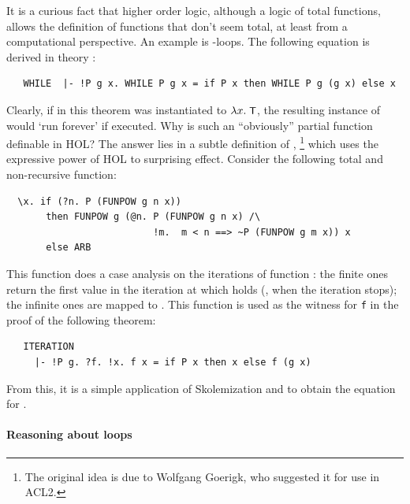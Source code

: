 {It is a curious fact that higher order logic, although a logic of
total functions, allows the definition of functions that don't
seem total, at least from a computational perspective. An example
is -loops. The following equation is derived in theory
:
%
\begin{hol}
\begin{verbatim}
   WHILE  |- !P g x. WHILE P g x = if P x then WHILE P g (g x) else x
\end{verbatim}
\end{hol}
%
Clearly, if  in this theorem was instantiated to $\lambda
x.\;\mbox{\small{\textbf{\sf{T}}}}$, the resulting instance of  would `run
forever' if executed. Why is such an ``obviously'' partial function
definable in HOL?
%
The answer lies in a subtle definition of ,
\footnote{The original idea is due to Wolfgang Goerigk,
          who suggested it for use in ACL2.}
which uses the expressive power of HOL to surprising effect. Consider
the following total and non-recursive function:
%
\begin{hol}
\begin{verbatim}
  \x. if (?n. P (FUNPOW g n x))
       then FUNPOW g (@n. P (FUNPOW g n x) /\
                          !m.  m < n ==> ~P (FUNPOW g m x)) x
       else ARB
\end{verbatim}
\end{hol}
%
This function does a case analysis on the iterations of function
\holtxt{g}: the finite ones return the first value in the iteration at
which \holtxt{P} holds (\ie, when the iteration stops); the infinite
ones are mapped to \holtxt{ARB}. This function is used as the witness
for \verb+f+ in the proof of the following theorem:
%
\begin{hol}
\begin{verbatim}
   ITERATION
     |- !P g. ?f. !x. f x = if P x then x else f (g x)
\end{verbatim}
\end{hol}
%
From this, it is a simple application of Skolemization and
 to obtain the equation for .

\paragraph{Reasoning about  loops}

}
